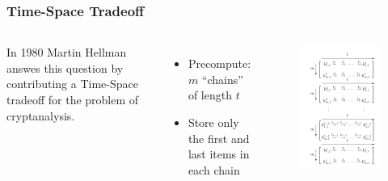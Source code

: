 \documentclass{beamer}
\begin{document}
\begin{frame}
\frametitle{Time-Space Tradeoff}
\begin{columns}[c]
In 1980 Martin Hellman answes this question by contributing a Time-Space tradeoff for the problem of cryptanalysis.
\begin{itemize}
\item Precompute: $m$ ``chains'' of length $t$
\item Store only the first and last items in each chain
\end{itemize}
\begin{figure}
\includegraphics[width=0.9\linewidth]{figs/classic}
\end{figure}
\end{columns}
\end{frame}
\end{document}
